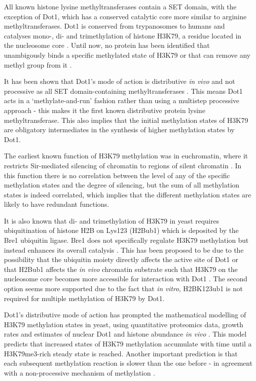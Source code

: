 \documentclass[11pt,twoside,a4paper]{report}
\begin{document}
		All known histone lysine methyltransferases contain a SET domain, with the exception of Dot1, which has a conserved catalytic core more similar to arginine methyltransferases. Dot1 is conserved from trypanosomes to humans and catalyses mono-, di- and trimethylation of histone H3K79, a residue located in the nucleosome core \cite{Kouzarides2007}. Until now, no protein has been identified that unambigously binds a specific methylated state of H3K79 or that can remove any methyl group from it \cite{Frederiks2008}.
		
		It has been shown that Dot1's mode of action is distributive \textit{in vivo} and not processive as all SET domain-containing methyltransferases \cite{Frederiks2008}. This means Dot1 acts in a ‘methylate-and-run’ fashion rather than using a multistep processive approach - this makes it the first known distributive protein lysine methyltransferase. This also implies that the initial methylation states of H3K79 are obligatory intermediates in the synthesis of higher methylation states by Dot1.
		
		The earliest known function of H3K79 methylation was in euchromatin, where it restricts Sir-mediated silencing of chromatin to regions of silent chromatin \cite{Frederiks2008}. In this function there is no correlation between the level of any of the specific methylation states and the degree of silencing, but the sum of all methylation states is indeed correlated, which implies that the different methylation states are likely to have redundant functions.
		
		It is also known that di- and trimethylation of H3K79 in yeast requires ubiquitination of histone H2B on Lys123 (H2Bub1) which is deposited by the Bre1 ubiquitin ligase. Bre1 does not specifically regulate H3K79 methylation but instead enhances its overall catalysis \cite{Kouzarides2007} \cite{Frederiks2008}. This has been proposed to be due to the possibility that the ubiquitin moiety directly affects the active site of Dot1 or that H2Bub1 affects the \textit{in vivo} chromatin substrate such that H3K79 on the nucleosome core becomes more accessible for interaction with Dot1 \cite{Frederiks2008}. The second option seems more supported due to the fact that \textit{in vitro}, H2BK123ub1 is not required for multiple methylation of H3K79 by Dot1.
		
		Dot1's distributive mode of action has prompted the mathematical modelling of H3K79 methylation states in yeast, using quantitative proteomics data, growth rates and estimates of nuclear Dot1 and histone abundance \textit{in vivo} \cite{DeVos2011}. This model predicts that increased states of H3K79 methylation accumulate with time until a H3K79me3-rich steady state is reached. Another important prediction is that each subsequent methylation reaction is slower than the one before - in agreement with a non-processive mechanism of methylation \cite{DeVos2011}.
			
\end{document}
